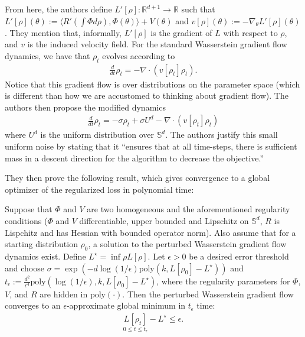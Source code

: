 \documentclass{article}
\newenvironment{manualtheorem}[1]{%
  \renewcommand\themanualtheoreminner{#1}%
  \manualtheoreminner
}{\endmanualtheoreminner}
\begin{document}
From here, the authors define $L'[\rho]: \mathbb{R}^{d+1} \rightarrow \mathbb{R}$ such that $L'[\rho](\theta) := \langle R'(\int \Phi d\rho), \Phi(\theta) \rangle + V(\theta)$ and $v[\rho](\theta) := - \nabla_{\theta} L'[\rho](\theta)$. They mention that, informally, $L'[\rho]$ is the gradient of $L$ with respect to $\rho$, and $v$ is the induced velocity field. For the standard Wasserstein gradient flow dynamics, we have that $\rho_t$ evolves according to 
\begin{align*}
\frac{d}{dt}\rho_t = -\nabla \cdot (v[\rho_t] \rho_t).
\end{align*}
Notice that this gradient flow is over distributions on the parameter space (which is different than how we are accustomed to thinking about gradient flow). The authors then propose the modified dynamics 
\begin{align*}
    \frac{d}{dt}\rho_t = - \sigma \rho_t  + \sigma U^d  - \nabla \cdot (v[\rho_t] \rho_t)
\end{align*}
where $U^d$ is the uniform distribution over $\mathbb{S}^d$. The authors justify this small uniform noise by stating that it \enquote{ensures that at all time-steps, there is sufficient mass in a descent direction for the algorithm to decrease the objective.}

They then prove the following result, which gives convergence to a global optimizer of the regularized loss in polynomial time:
\begin{manualtheorem}{3.3}
Suppose that $\Phi$ and $V$ are two homogeneous and the aforementioned regularity conditions ($\Phi$ and $V$ differentiable, upper bounded and Lipschitz on $\mathbb{S}^d$, $R$ is Lispchitz and has Hessian with bounded operator norm). Also assume that for a starting distribution $\rho_0$, a solution to the perturbed Wasserstein gradient flow dynamics exist. Define $L^{\star} = \inf{\rho} L[\rho]$. Let $\epsilon > 0$ be a desired error threshold and choose $\sigma = \exp(-d\log(1/\epsilon)\text{poly}(k, L[\rho_0] - L^{\star}))$ and $t_{\epsilon} := \frac{d^2}{\epsilon^4} \text{poly}(\log(1/\epsilon), k, L[\rho_0] - L^{\star})$, where the regularity parameters for $\Phi$, $V$, and $R$ are hidden in $\text{poly}(\cdot)$. Then the perturbed Wasserstein gradient flow converges to an $\epsilon$-approximate global minimum in $t_{\epsilon}$ time:
\begin{align*}
    \underset{0 \leq t \leq t_{\epsilon}}{L[\rho_t]} - L^{\star} \leq \epsilon.
\end{align*}

\end{manualtheorem}
\end{document}
